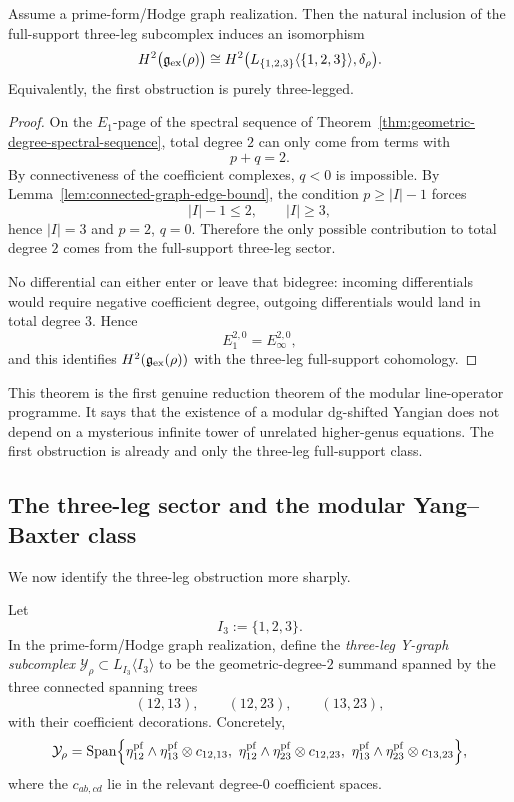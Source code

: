 \begin{theorem}
\label{thm:three-leg-reduction-of-H2}
Assume a prime-form/Hodge graph realization.
Then the natural inclusion of the full-support three-leg subcomplex induces an isomorphism
\[
H^2\bigl(\mathfrak g_{\mathrm{ex}}(\rho)\bigr)
\cong
H^2\bigl(L_{\{1,2,3\}}\langle \{1,2,3\}\rangle,\delta_\rho\bigr).
\]
Equivalently, the first obstruction is purely three-legged.
\end{theorem}

\begin{proof}
On the $E_1$-page of the spectral sequence of
Theorem~\ref{thm:geometric-degree-spectral-sequence}, total degree $2$ can only come from terms with
\[
p+q=2.
\]
By connectiveness of the coefficient complexes, $q<0$ is impossible. By
Lemma~\ref{lem:connected-graph-edge-bound}, the condition $p\ge |I|-1$ forces
\[
|I|-1\le 2,
\qquad |I|\ge 3,
\]
hence $|I|=3$ and $p=2$, $q=0$. Therefore the only possible contribution to total degree $2$
comes from the full-support three-leg sector.

No differential can either enter or leave that bidegree:
incoming differentials would require negative coefficient degree, outgoing differentials would land in
total degree $3$. Hence
\[
E_1^{2,0}=E_\infty^{2,0},
\]
and this identifies $H^2(\mathfrak g_{\mathrm{ex}}(\rho))$ with the three-leg full-support cohomology.
\end{proof}

\begin{remark}
This theorem is the first genuine reduction theorem of the modular line-operator programme.
It says that the existence of a modular dg-shifted Yangian does not depend on a mysterious infinite
tower of unrelated higher-genus equations. The first obstruction is already and only the three-leg
full-support class.
\end{remark}

\subsection{The three-leg sector and the modular Yang--Baxter class}

We now identify the three-leg obstruction more sharply.

\begin{definition}
\label{def:three-leg-Y-graph-complex}
Let
\[
I_3:=\{1,2,3\}.
\]
In the prime-form/Hodge graph realization, define the \emph{three-leg Y-graph subcomplex}
$\mathcal Y_\rho\subset L_{I_3}\langle I_3\rangle$ to be the geometric-degree-$2$ summand spanned by
the three connected spanning trees
\[
(12,13),\qquad (12,23),\qquad (13,23),
\]
with their coefficient decorations.
Concretely,
\[
\mathcal Y_\rho
=
\Span\Bigl\{
\eta_{12}^{\pf}\wedge \eta_{13}^{\pf}\otimes c_{12,13},\ 
\eta_{12}^{\pf}\wedge \eta_{23}^{\pf}\otimes c_{12,23},\ 
\eta_{13}^{\pf}\wedge \eta_{23}^{\pf}\otimes c_{13,23}
\Bigr\},
\]
where the $c_{ab,cd}$ lie in the relevant degree-$0$ coefficient spaces.
\end{definition}

